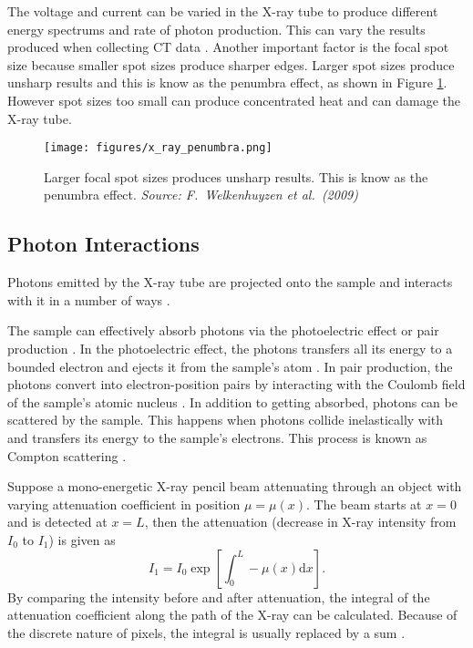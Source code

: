 \documentclass[12pt, a4paper]{memoir}
\newcommand{\diff}{\mathrm{d}}
\begin{document}
The voltage and current can be varied in the X-ray tube to produce different energy spectrums and rate of photon production. This can vary the results produced when collecting CT data \citep{cantatore2011introduction}. Another important factor is the focal spot size because smaller spot sizes produce sharper edges. Larger spot sizes produce unsharp results and this is know as the penumbra effect, as shown in Figure \ref{fig:x_ray_penumbra}. However spot sizes too small can produce concentrated heat \citep{welkenhuyzen2009industrial} and can damage the X-ray tube.

\begin{figure}
\centering
\texttt{[image: figures/x\_ray\_penumbra.png]}
\caption{Larger focal spot sizes produces unsharp results. This is know as the penumbra effect. \emph{Source: F.~Welkenhuyzen et al.~(2009)\citep{welkenhuyzen2009industrial}}}
\label{fig:x_ray_penumbra}
\end{figure}

\subsection{Photon Interactions}
Photons emitted by the X-ray tube are projected onto the sample and interacts with it in a number of ways \citep{cantatore2011introduction}.

The sample can effectively absorb photons via the photoelectric effect or pair production \citep{cantatore2011introduction}. In the photoelectric effect, the photons transfers all its energy to a bounded electron and ejects it from the sample's atom \citep{millikan1916direct}. In pair production, the photons convert into electron-position pairs by interacting with the Coulomb field of the sample's atomic nucleus \citep{hubbell2006electron}. In addition to getting absorbed, photons can be scattered by the sample. This happens when photons collide inelastically with and transfers its energy to the sample's electrons. This process is known as Compton scattering \citep{compton1923quantum}.

Suppose a mono-energetic X-ray pencil beam attenuating through an object with varying attenuation coefficient in position $\mu=\mu(x)$. The beam starts at $x=0$ and is detected at $x=L$, then the attenuation (decrease in X-ray intensity from $I_0$ to $I_1$) is given as \citep{cantatore2011introduction}
\begin{equation}
I_1 = I_0\exp\left[\int_0^L-\mu(x)\diff x\right].
\label{eq:beerLaw}
\end{equation}
By comparing the intensity before and after attenuation, the integral of the attenuation coefficient along the path of the X-ray can be calculated. Because of the discrete nature of pixels, the integral is usually replaced by a sum \citep{michael2001x}. 
\end{document}
